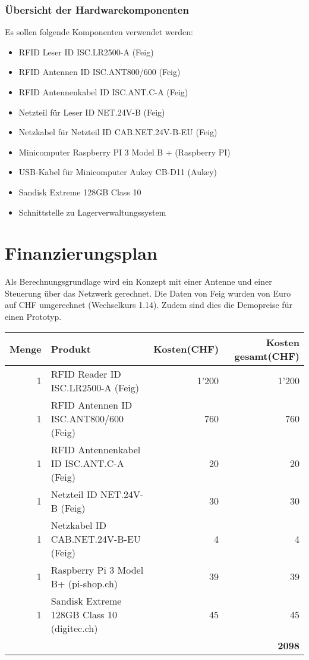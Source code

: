 \subsubsection{Übersicht der Hardwarekomponenten}
Es sollen folgende Komponenten verwendet werden:
\begin{itemize}
	\item RFID Leser ID ISC.LR2500-A  (Feig)
	\item RFID Antennen ID ISC.ANT800/600 (Feig)
	\item RFID Antennenkabel ID ISC.ANT.C-A (Feig)
	\item Netzteil für Leser ID NET.24V-B (Feig)
	\item Netzkabel für Netzteil ID CAB.NET.24V-B-EU  (Feig)
	\item Minicomputer Raspberry PI 3 Model B + (Raspberry PI)
	\item USB-Kabel für Minicomputer Aukey CB-D11 (Aukey)
	\item Sandisk Extreme 128GB Class 10
	\item Schnittstelle zu Lagerverwaltungssystem
\end{itemize}

\section{Finanzierungsplan}

Als Berechnungsgrundlage wird ein Konzept mit einer Antenne und einer Steuerung über das Netzwerk gerechnet. Die Daten von Feig wurden von Euro auf CHF umgerechnet (Wechselkurs 1.14). Zudem sind dies die Demopreise für einen Prototyp.

\vspace{1em}

\begin{tabularx}{\textwidth}{|r|X|r|r|}
	\hline 
	\textbf{Menge} & \textbf{Produkt} & \textbf{Kosten(CHF)} & \textbf{Kosten gesamt(CHF)} \\
	\hline 
	1 & RFID Reader ID ISC.LR2500-A (Feig) & 1'200 & 1'200 \\ 
	\hline 
	1 & RFID Antennen ID ISC.ANT800/600 (Feig)& 760 & 760 \\
	\hline
	1 & RFID Antennenkabel ID ISC.ANT.C-A (Feig) & 20 & 20 \\
	\hline
	1 & Netzteil ID NET.24V-B (Feig) & 30 & 30 \\
	\hline
	1 & Netzkabel ID CAB.NET.24V-B-EU (Feig) & 4 & 4 \\
	\hline
	1 & Raspberry Pi 3 Model B+ (pi-shop.ch)& 39 & 39 \\
	\hline
	1 & Sandisk Extreme 128GB Class 10 (digitec.ch)& 45 & 45 \\
	\hline
	& & & \textbf{2098} \\
	\hline
\end{tabularx} 
